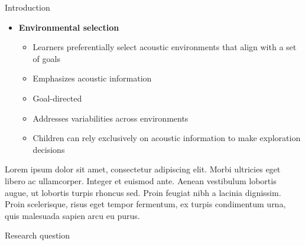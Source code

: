 \documentclass[final]{beamer}
\newlength{\colwidth}
\begin{document}
\begin{frame}[t]
\begin{columns}[t]
\begin{column}{\colwidth}
\begin{block}{Introduction}
\begin{itemize}
\begin{itemize}
          \item Traditional active learning:
            \begin{itemize}
              \item Learners interact with individual stimuli within their environment (Settles, 2009)
              \item Accurate stimuli labeling is a primary goal
            \end{itemize}
          \item Ecological active learning:
            \begin{itemize} 
              \item Children learn by tracking environmental features and adapt their exploration strategies accordingly (Ruggeri, 2022)
              \item Exploratory strategies for learning are context-dependent 
              \item Exploit statistical regularities in the environment to reduce demands on cognition
            \end{itemize}
        \end{itemize}
      \item \textbf{Environmental selection}
        \begin{itemize}
          \item Learners preferentially select acoustic environments that align with a set of goals
          \item Emphasizes acoustic information
          \item Goal-directed
          \item Addresses variabilities across environments
          \item Children can rely exclusively on acoustic information to make exploration decisions
        \end{itemize}
    \end{itemize}       

    Lorem ipsum dolor sit amet, consectetur adipiscing elit. Morbi ultricies
    eget libero ac ullamcorper. Integer et euismod ante. Aenean vestibulum
    lobortis augue, ut lobortis turpis rhoncus sed. Proin feugiat nibh a
    lacinia dignissim. Proin scelerisque, risus eget tempor fermentum, ex
    turpis condimentum urna, quis malesuada sapien arcu eu purus.

  \end{block}
  
    \begin{block}{Research question}
    

\end{block}
\end{column}
\end{columns}
\end{frame}
\end{document}
